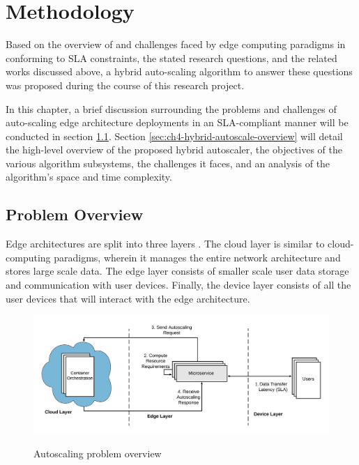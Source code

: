 \clearpage

\def\chaptertitle{Methodology}

\lhead{\emph{\chaptertitle}}

\chapter{\chaptertitle}
\label{ch:methodology}

Based on the overview of and challenges faced by edge computing paradigms in conforming to SLA constraints, the stated research questions, and the related works discussed above, a hybrid auto-scaling algorithm to answer these questions was proposed during the course of this research project.\par

In this chapter, a brief discussion surrounding the problems and challenges of auto-scaling edge architecture deployments in an SLA-compliant manner will be conducted in section \ref{sec:ch4-problem-overview}. Section \ref{sec:ch4-hybrid-autoscale-overview} will detail the high-level overview of the proposed hybrid autoscaler, the objectives of the various algorithm subsystems, the challenges it faces, and an analysis of the algorithm's space and time complexity.

\section{Problem Overview}
\label{sec:ch4-problem-overview}

Edge architectures are split into three layers \cite{hamdan2020edge}. 
The cloud layer is similar to cloud-computing paradigms, wherein it manages the entire network architecture and stores large scale data. The edge layer consists of smaller scale user data storage and communication with user devices. Finally, the device layer consists of all the user devices that will interact with the edge architecture.\par

\begin{figure}[htb]
    \centering
    \caption{Autoscaling problem overview}
    \includegraphics[width=1.0\linewidth]{Figures/Problem-Overview.pdf}
    \label{fig:autoscaling-problem-overview}
\end{figure}

